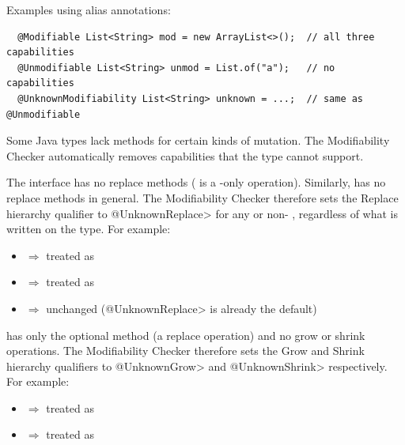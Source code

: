 \noindent
Examples using alias annotations:

\begin{Verbatim}
  @Modifiable List<String> mod = new ArrayList<>();  // all three capabilities
  @Unmodifiable List<String> unmod = List.of("a");   // no capabilities
  @UnknownModifiability List<String> unknown = ...;  // same as @Unmodifiable
\end{Verbatim}



Some Java types lack methods for certain kinds of mutation.  The
Modifiability Checker automatically removes capabilities that the type
cannot support.

The  interface has no replace methods ( is a
-only operation).  Similarly,  has no replace
methods in general.  The Modifiability Checker therefore sets the
Replace hierarchy qualifier to \<@UnknownReplace> for any  or
non- , regardless of what is written on the
type.  For example:

\begin{itemize}
    \item {} $\Rightarrow$
      treated as 
    \item {} $\Rightarrow$
      treated as 
    \item {} $\Rightarrow$ unchanged
      (\<@UnknownReplace> is already the default)
\end{itemize}

 has only the optional  method (a
replace operation) and no grow or shrink operations.  The Modifiability
Checker therefore sets the Grow and Shrink hierarchy qualifiers to
\<@UnknownGrow> and \<@UnknownShrink> respectively.  For example:

\begin{itemize}
    \item {} $\Rightarrow$
      treated as 
    \item {} $\Rightarrow$
      treated as 
\end{itemize}

